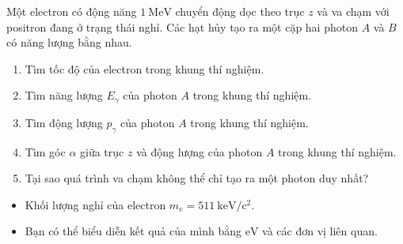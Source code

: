 \begin{vd}
    Một electron có động năng $1~\mathrm{MeV}$ chuyển động dọc theo trục $z$ và va chạm với positron đang ở trạng thái nghỉ. Các hạt hủy tạo ra một cặp hai photon $A$ và $B$ có năng lượng bằng nhau.
    \begin{enumerate}[1)]
        \item Tìm tốc độ của electron trong khung thí nghiệm.
        \item Tìm năng lượng $E_\gamma$ của photon $A$ trong khung thí nghiệm.
        \item Tìm động lượng $p_\gamma$ của photon $A$ trong khung thí nghiệm.
        \item Tìm góc $\alpha$ giữa trục $z$ và động lượng của photon $A$ trong khung thí nghiệm.
        \item Tại sao quá trình va chạm không thể chỉ tạo ra một     photon duy nhất?
    \end{enumerate}
    \begin{itemize}
        \item Khối lượng nghỉ của electron $m_e = 511~\mathrm{keV}/ \mathrm{c}^2$.
        \item Bạn có thể biểu diễn kết quả của mình bằng $\mathrm{eV}$ và các đơn vị liên quan.
    \end{itemize}
\end{vd}

